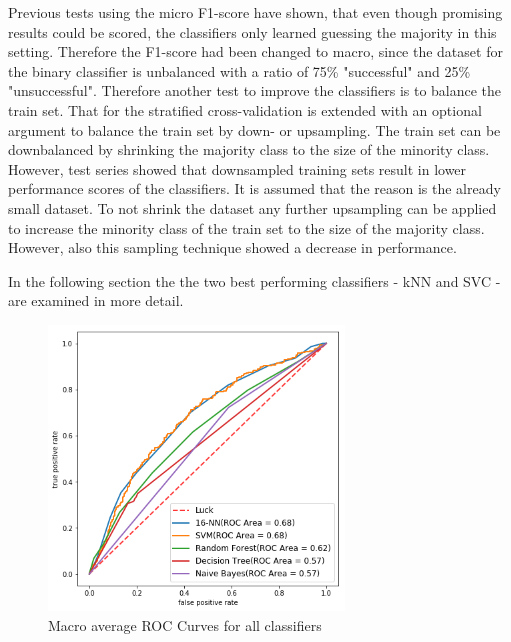 Previous tests using the micro F1-score have shown, that even though promising results could be scored, the classifiers only learned guessing the majority in this setting. Therefore the F1-score had been changed to macro,
 since the dataset for the binary classifier is unbalanced with a ratio of 75\% "successful" and 25\% "unsuccessful". Therefore another test to improve the classifiers is to balance the train set.
That for the stratified cross-validation is extended with an optional argument to balance the train set by down- or upsampling.
The train set can be downbalanced by shrinking the majority class to the size of the minority class. However, test series showed that downsampled training sets result in lower performance scores of the classifiers. It is assumed that the reason is the already small dataset.
To not shrink the dataset any further upsampling can be applied to increase the minority class of the train set to the size of the majority class. However, also this sampling technique showed a decrease in performance.

In the following section the the two best performing classifiers - kNN and SVC - are examined in more detail.
\begin{figure}[h]
	\center
	\includegraphics[width=0.7\textwidth]{images/roc.png}
	\caption{Macro average ROC Curves for all classifiers}
	\label{img:roc}
\end{figure}


